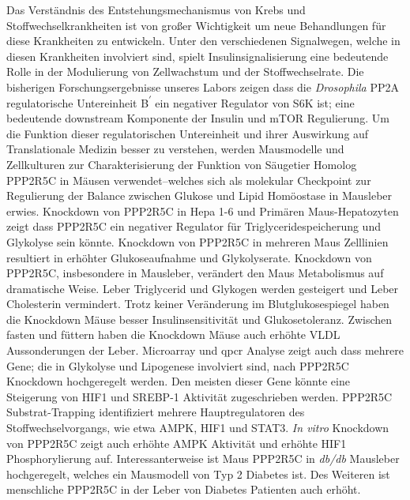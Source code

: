 
Das Verständnis des Entstehungsmechanismus von Krebs und Stoffwechselkrankheiten ist von gro{\ss}er Wichtigkeit um neue Behandlungen für diese Krankheiten zu entwickeln. Unter den verschiedenen Signalwegen, welche in diesen Krankheiten involviert sind, spielt Insulinsignalisierung eine bedeutende Rolle in der Modulierung von Zellwachstum und der Stoffwechselrate. Die bisherigen Forschungsergebnisse unseres Labors \cite{hahn_pp2a_2010} zeigen dass die \textit{Drosophila} PP2A regulatorische Untereinheit B\textsuperscript{$\prime$} ein negativer Regulator von S6K ist; eine bedeutende downstream Komponente der Insulin und mTOR Regulierung. Um die Funktion dieser regulatorischen Untereinheit und ihrer Auswirkung auf Translationale Medizin besser zu verstehen, werden Mausmodelle und Zellkulturen zur Charakterisierung der Funktion von Säugetier Homolog PPP2R5C in Mäusen verwendet--welches sich als molekular Checkpoint zur Regulierung der Balance zwischen Glukose und Lipid Homöostase in Mausleber erwies. Knockdown von PPP2R5C in Hepa 1-6 und Primären Maus-Hepatozyten zeigt dass PPP2R5C ein negativer Regulator für Triglyceridespeicherung und Glykolyse sein könnte. Knockdown von PPP2R5C in mehreren Maus Zelllinien resultiert in erhöhter Glukoseaufnahme und Glykolyserate. Knockdown von PPP2R5C, insbesondere in Mausleber, verändert den Maus Metabolismus auf dramatische Weise. Leber Triglycerid und Glykogen werden gesteigert und Leber Cholesterin vermindert. Trotz keiner Veränderung im Blutglukosespiegel haben die Knockdown Mäuse besser Insulinsensitivität und Glukosetoleranz. Zwischen fasten und füttern haben die Knockdown Mäuse auch erhöhte VLDL Aussonderungen der Leber. Microarray und \gls{qpcr} Analyse zeigt auch dass mehrere Gene; die in Glykolyse und Lipogenese involviert sind, nach PPP2R5C Knockdown hochgeregelt werden. Den meisten dieser Gene könnte eine Steigerung von HIF1\textalpha{} und SREBP-1 Aktivität zugeschrieben werden. PPP2R5C Substrat-Trapping identifiziert mehrere Hauptregulatoren des Stoffwechselvorgangs, wie etwa AMPK, HIF1\textalpha{} und STAT3. \textit{In vitro} Knockdown von PPP2R5C zeigt auch erhöhte AMPK Aktivität und erhöhte HIF1\textalpha{} Phosphorylierung auf. Interessanterweise ist Maus PPP2R5C in \textit{db/db} Mausleber hochgeregelt, welches ein Mausmodell von Typ 2 Diabetes ist. Des Weiteren ist menschliche PPP2R5C in der Leber von Diabetes Patienten auch erhöht.
